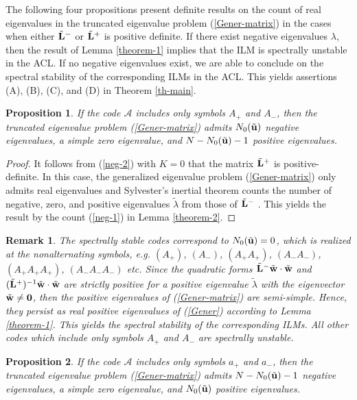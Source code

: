 \documentclass[12pt,reqno]{amsart}
\newtheorem{remark}{Remark}
\newtheorem{prop}{Proposition}
\begin{document}
The following four propositions present definite results on 
the count of real eigenvalues in the truncated eigenvalue problem (\ref{Gener-matrix}) in the cases when either $\tilde{\bf L}^-$ or $\tilde{\bf L}^+$ is positive definite. If there exist negative eigenvalues $\lambda$, then the result of Lemma \ref{theorem-1} implies that the ILM is spectrally unstable in the ACL. If no negative eigenvalues exist, we are able to conclude on the 
spectral stability of the corresponding ILMs in the ACL. This yields assertions (A), (B), (C), and (D) in Theorem \ref{th-main}.

\begin{prop}
	\label{prop-1}
	If the code $\mathcal{A}$ includes only symbols $A_+$ and $A_-$, then 
	the truncated eigenvalue problem (\ref{Gener-matrix}) admits $N_0(\tilde{\bf u})$ negative eigenvalues, a simple zero eigenvalue, and $N - N_0(\tilde{\bf u}) -1$ positive eigenvalues. 
\end{prop}

\begin{proof}
	It follows from (\ref{neg-2}) with $K = 0$ that the matrix $\tilde{\bf L}^+$ is positive-definite. In this case, the generalized eigenvalue problem (\ref{Gener-matrix}) only admits real eigenvalues and Sylvester's inertial theorem counts the number of negative, zero, and positive eigenvalues $\tilde{\lambda}$ from those of $\tilde{\bf L}^-$ \cite{Gelfand}. This yields the result by the count (\ref{neg-1}) in Lemma \ref{theorem-2}.
\end{proof}

\begin{remark}
	The spectrally stable codes correspond to $N_0(\tilde{\bf u}) = 0$, which is realized at the nonalternating symbols, e.g. $(A_+)$, $(A_-)$, $(A_+A_+)$, $(A_-A_-)$, $(A_+A_+A_+)$, $(A_-A_-A_-)$ etc. Since the quadratic forms 
	$\tilde{\bf L}^- \tilde{\bf w}  \cdot \tilde{\bf w} $ and  $(\tilde{\bf L}^+)^{-1} \tilde{\bf w}  \cdot \tilde{\bf w} $ are strictly positive for a positive eigenvalue $\tilde{\lambda}$ with the eigenvector $\tilde{\bf w} \neq {\bf 0}$, then the positive eigenvalues of (\ref{Gener-matrix}) are semi-simple. Hence, they persist as real positive eigenvalues of (\ref{Gener}) according to Lemma \ref{theorem-1}. This yields the spectral stability of the corresponding ILMs. All other codes which include only symbols $A_+$ and $A_-$ are spectrally unstable. 
\end{remark}

\begin{prop}
	\label{prop-2}
	If the code $\mathcal{A}$ includes only symbols $a_+$ and $a_-$, then 
	the truncated eigenvalue problem (\ref{Gener-matrix}) admits $N - N_0(\tilde{\bf u}) -1$ negative eigenvalues, a simple zero eigenvalue, and $N_0(\tilde{\bf u})$ positive eigenvalues. 
\end{prop}
\end{document}
